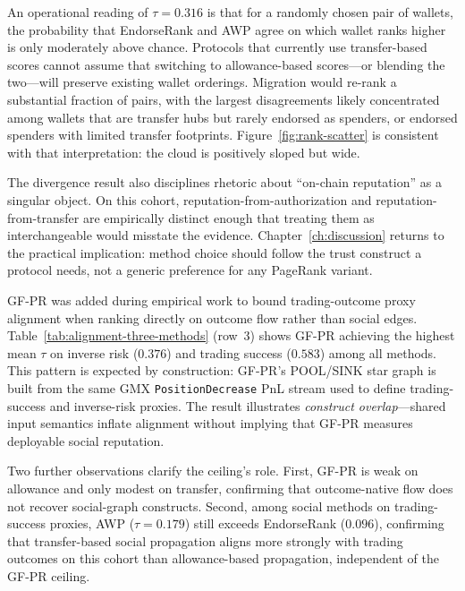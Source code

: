 An operational reading of $\tau=0.316$ is that for a randomly chosen pair of wallets, the probability that EndorseRank and AWP agree on which wallet ranks higher is only moderately above chance. Protocols that currently use transfer-based scores cannot assume that switching to allowance-based scores---or blending the two---will preserve existing wallet orderings. Migration would re-rank a substantial fraction of pairs, with the largest disagreements likely concentrated among wallets that are transfer hubs but rarely endorsed as spenders, or endorsed spenders with limited transfer footprints. Figure~\ref{fig:rank-scatter} is consistent with that interpretation: the cloud is positively sloped but wide.

The divergence result also disciplines rhetoric about ``on-chain reputation'' as a singular object. On this cohort, reputation-from-authorization and reputation-from-transfer are empirically distinct enough that treating them as interchangeable would misstate the evidence. Chapter~\ref{ch:discussion} returns to the practical implication: method choice should follow the trust construct a protocol needs, not a generic preference for any PageRank variant.


GF-PR was added during empirical work to bound trading-outcome proxy alignment when ranking directly on outcome flow rather than social edges. Table~\ref{tab:alignment-three-methods} (row~3) shows GF-PR achieving the highest mean $\tau$ on inverse risk ($0.376$) and trading success ($0.583$) among all methods. This pattern is expected by construction: GF-PR's POOL/SINK star graph is built from the same GMX \texttt{PositionDecrease} PnL stream used to define trading-success and inverse-risk proxies. The result illustrates \emph{construct overlap}---shared input semantics inflate alignment without implying that GF-PR measures deployable social reputation.

Two further observations clarify the ceiling's role. First, GF-PR is weak on allowance and only modest on transfer, confirming that outcome-native flow does not recover social-graph constructs. Second, among social methods on trading-success proxies, AWP ($\tau=0.179$) still exceeds EndorseRank ($0.096$), confirming that transfer-based social propagation aligns more strongly with trading outcomes on this cohort than allowance-based propagation, independent of the GF-PR ceiling.

